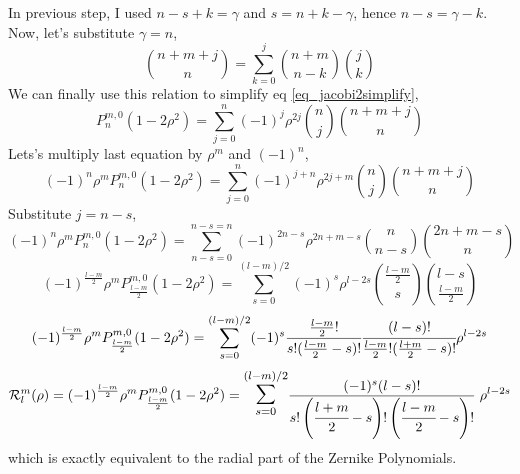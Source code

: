 In previous step, I used $n-s+k=\gamma$ and $s=n+k-\gamma$, hence $n-s=\gamma-k$. Now, let's substitute $\gamma=n$,
\begin{equation}
    \binom{n+m+j}{n} = \sum_{k=0}^{j} \binom{n+m}{n-k} \binom{j}{k}
\end{equation}
We can finally use this relation to simplify eq \ref{eq_jacobi2simplify},
\begin{equation}
    P_{n}^{m, 0}(1-2\rho^2) = \sum_{j=0}^{n} (-1)^{j}  \rho^{2j}  \binom{n}{j} \binom{n+m+j}{n}
\end{equation}
Lets's multiply last equation by $\rho^m$ and $(-1)^n$,
\begin{equation}
    (-1)^n\rho^mP_{n}^{m, 0}(1-2\rho^2) = \sum_{j=0}^{n} (-1)^{j+n}  \rho^{2j+m} \binom{n}{j} \binom{n+m+j}{n}
\end{equation}
Substitute $j=n-s$,
\begin{equation}
    (-1)^n\rho^mP_{n}^{m, 0}(1-2\rho^2) = \sum_{n-s=0}^{n-s=n} (-1)^{2n-s}  \rho^{2n+m-s}  \binom{n}{n-s} \binom{2n+m-s}{n}
\end{equation}
\begin{equation}
    (-1)^{\frac{l-m}{2}}\rho^mP_{\frac{l-m}{2}}^{m, 0}(1-2\rho^2) = 
    \sum_{s=0}^{(l-m)/2} (-1)^{s}  \rho^{l-2s}  \binom{\frac{l-m}{2}}{s} \binom{l-s}{\frac{l-m}{2}}
\end{equation}
\begin{equation}
    (-1)^{\frac{l-m}{2}}\rho^mP_{\frac{l-m}{2}}^{m, 0}(1-2\rho^2) = 
    \sum_{s=0}^{(l-m)/2} (-1)^{s} \cfrac{\frac{l-m}{2}!}{s!(\frac{l-m}{2}-s)!} \cfrac{(l-s)!}{\frac{l-m}{2}!(\frac{l+m}{2}-s)!} \rho^{l-2s}  
\end{equation}
\begin{equation}
    \mathcal{R}_l^{m} (\rho) = (-1)^{\frac{l-m}{2}}\rho^mP_{\frac{l-m}{2}}^{m, 0}(1-2\rho^2) = \mathlarger{\mathlarger{\sum}}_{s=0}^{(l-m)/2} \frac{(-1)^s(l-s)!}{ s!\left( \cfrac{l+m}{2} - s\right)! \left( \cfrac{l-m}{2} - s\right)!}  \hspace{0.1cm} \rho^{l-2s} 
\end{equation}
which is exactly equivalent to the radial part of the Zernike Polynomials.